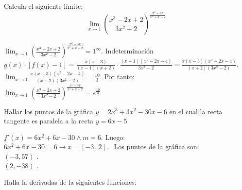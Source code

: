 \documentclass[addpoints,spanish, 12pt,a4paper]{exam}
\begin{document}
\begin{questions}
		



\question[6] Calcula el siguiente límite: $$\lim_{x \to 1} \left(\frac{x^{3} - 2 x + 2}{3 x^{2} - 2}\right)^{\frac{x^{2} - 3 x}{x^{2} + x - 2}}$$
\begin{solution}
$\lim_{x \to 1} \left(\frac{x^{3} - 2 x + 2}{3 x^{2} - 2}\right)^{\frac{x^{2} - 3 x}{x^{2} + x - 2}}=1^\infty$. Indeterminación \\ $g(x)\cdot\left[f(x)-1\right]=\frac{x \left(x - 3\right)}{\left(x - 1\right) \left(x + 2\right)}\cdot\frac{\left(x - 1\right) \left(x^{2} - 2 x - 4\right)}{3 x^{2} - 2}=\frac{x \left(x - 3\right) \left(x^{2} - 2 x - 4\right)}{\left(x + 2\right) \left(3 x^{2} - 2\right)}$. \\ $\lim_{x \to 1}\frac{x \left(x - 3\right) \left(x^{2} - 2 x - 4\right)}{\left(x + 2\right) \left(3 x^{2} - 2\right)}=\frac{10}{3}$. Por tanto: \\ $\lim_{x \to 1} \left(\frac{x^{3} - 2 x + 2}{3 x^{2} - 2}\right)^{\frac{x^{2} - 3 x}{x^{2} + x - 2}}=e^{\frac{10}{3}}$

\end{solution}
\addpoints

\question[4] Hallar los puntos de la gráfica $y=2 x^{3} + 3 x^{2} - 30 x - 6$ en el cual la recta tangente es paralela a la recta $y=6 x - 5$
\begin{solution}$f'(x)=6 x^{2} + 6 x - 30\land m=6$. Luego: \\ $6 x^{2} + 6 x - 30 = 6 \to x =\left[ -3, \  2\right] $. \ Los puntos de la gráfica son: \\   $\left(-3,57 \right)$ . \\  $\left(2,-38 \right)$ . \\ 
\end{solution}
\addpoints

\question Halla la derivadas de la siguientes funciones:

\begin{parts}

\end{parts}
\end{questions}
\end{document}
